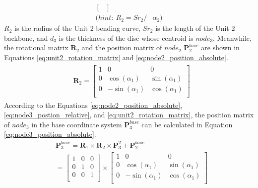\begin{itemize}
\begin{align}
\begin{bmatrix}
        \end{bmatrix}&
        \label{eq:node3_postion_relative} \\
        \nonumber (hint: \ R_2 = {Sr}_2/ &\alpha_2)
    \end{align}
    $R_2$ is the radius of the Unit 2 bending curve, ${Sr}_2$ is the length of the Unit 2 backbone, and $d_3$ is the thickness 
    of the disc whose centroid is $node_3$. Meanwhile, the rotational matrix $\textbf{R}_{2}$ and the position matrix of 
    $node_2$ $\textbf{P}_{2}^{base}$ are shown in Equations \ref*{eq:unit2_rotation_matrix} and \ref{eq:node2_position_absolute}.
    \begin{align}
        &\begin{aligned}
            \textbf{R}_{2} = 
            \begin{bmatrix}
                1 & 0 & 0 \\
                0 & \cos(\alpha_1) & \sin(\alpha_1) \\
                0 & -\sin(\alpha_1) & \cos(\alpha_1) \\
            \end{bmatrix}
        \end{aligned}
        \label{eq:unit2_rotation_matrix}
    \end{align}
    According to the Equations \ref{eq:node2_position_absolute}, \ref{eq:node3_postion_relative}, and \ref*{eq:unit2_rotation_matrix}, 
    the position matrix of $node_{3}$ in the base coordinate system $\textbf{P}_{3}^{base}$ can be calculated in Equation \ref{eq:node3_position_absolute}.
    \begin{align}
        &\textbf{P}_{3}^{base} = \textbf{R}_{1} \times \textbf{R}_{2} \times \textbf{P}_{3}^{2} + \textbf{P}_{2}^{base} \nonumber \\
        &= 
        \begin{bmatrix}
            1 & 0 & 0 \\
            0 & 1 & 0 \\
            0 & 0 & 1 \\
        \end{bmatrix}
        \times
        \begin{bmatrix}
            1 & 0 & 0 \\
            0 & \cos(\alpha_1) & \sin(\alpha_1) \\
            0 & -\sin(\alpha_1) & \cos(\alpha_1) \\
        \end{bmatrix} \nonumber \\

\end{align}
\end{itemize}
